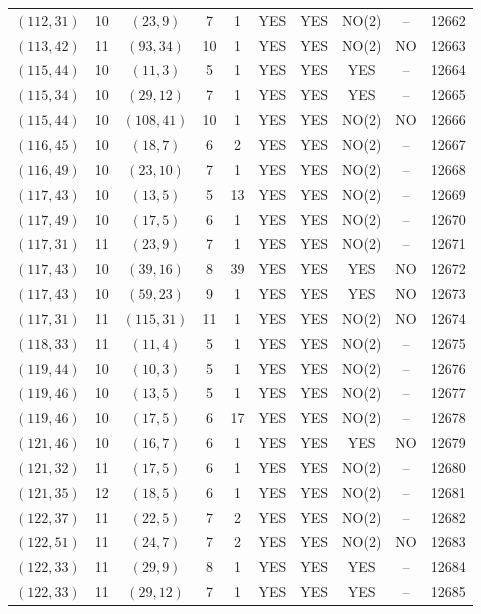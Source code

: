 \begin{longtable}{|c|c|c|c|c|c|c|c|c|c|}
$(112, 31)$ & 10 & $(23, 9)$ & 7 & 1 & YES & YES & NO(2) & -- & 12662\\
$(113, 42)$ & 11 & $(93, 34)$ & 10 & 1 & YES & YES & NO(2) & NO & 12663\\
$(115, 44)$ & 10 & $(11, 3)$ & 5 & 1 & YES & YES & YES & -- & 12664\\
$(115, 34)$ & 10 & $(29, 12)$ & 7 & 1 & YES & YES & YES & -- & 12665\\
$(115, 44)$ & 10 & $(108, 41)$ & 10 & 1 & YES & YES & NO(2) & NO & 12666\\
$(116, 45)$ & 10 & $(18, 7)$ & 6 & 2 & YES & YES & NO(2) & -- & 12667\\
$(116, 49)$ & 10 & $(23, 10)$ & 7 & 1 & YES & YES & NO(2) & -- & 12668\\
$(117, 43)$ & 10 & $(13, 5)$ & 5 & 13 & YES & YES & NO(2) & -- & 12669\\
$(117, 49)$ & 10 & $(17, 5)$ & 6 & 1 & YES & YES & NO(2) & -- & 12670\\
$(117, 31)$ & 11 & $(23, 9)$ & 7 & 1 & YES & YES & NO(2) & -- & 12671\\
$(117, 43)$ & 10 & $(39, 16)$ & 8 & 39 & YES & YES & YES & NO & 12672\\
$(117, 43)$ & 10 & $(59, 23)$ & 9 & 1 & YES & YES & YES & NO & 12673\\
$(117, 31)$ & 11 & $(115, 31)$ & 11 & 1 & YES & YES & NO(2) & NO & 12674\\
$(118, 33)$ & 11 & $(11, 4)$ & 5 & 1 & YES & YES & NO(2) & -- & 12675\\
$(119, 44)$ & 10 & $(10, 3)$ & 5 & 1 & YES & YES & NO(2) & -- & 12676\\
$(119, 46)$ & 10 & $(13, 5)$ & 5 & 1 & YES & YES & NO(2) & -- & 12677\\
$(119, 46)$ & 10 & $(17, 5)$ & 6 & 17 & YES & YES & NO(2) & -- & 12678\\
$(121, 46)$ & 10 & $(16, 7)$ & 6 & 1 & YES & YES & YES & NO & 12679\\
$(121, 32)$ & 11 & $(17, 5)$ & 6 & 1 & YES & YES & NO(2) & -- & 12680\\
$(121, 35)$ & 12 & $(18, 5)$ & 6 & 1 & YES & YES & NO(2) & -- & 12681\\
$(122, 37)$ & 11 & $(22, 5)$ & 7 & 2 & YES & YES & NO(2) & -- & 12682\\
$(122, 51)$ & 11 & $(24, 7)$ & 7 & 2 & YES & YES & NO(2) & NO & 12683\\
$(122, 33)$ & 11 & $(29, 9)$ & 8 & 1 & YES & YES & YES & -- & 12684\\
$(122, 33)$ & 11 & $(29, 12)$ & 7 & 1 & YES & YES & YES & -- & 12685\\

\end{longtable}
